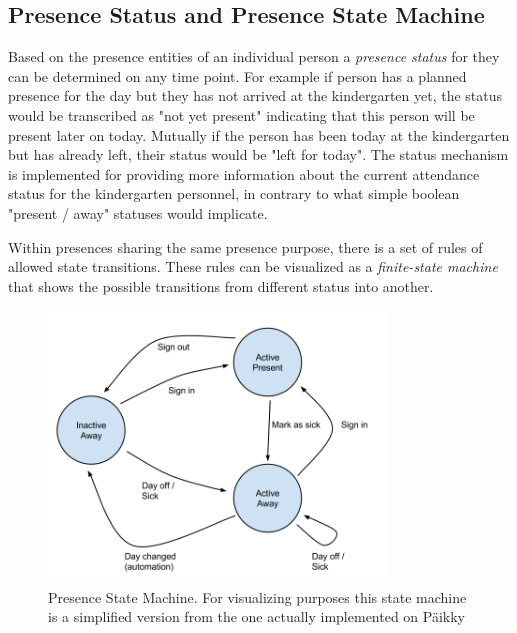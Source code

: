 \subsection{Presence Status and Presence State Machine}

Based on the presence entities of an individual person a \textit{presence status} for they can be determined on any time point. For example if person has a planned presence for the day but they has not arrived at the kindergarten yet, the status would be transcribed as "not yet present" indicating that this person will be present later on today. Mutually if the person has been today at the kindergarten but has already left, their status would be "left for today". The status mechanism is implemented for providing more information about the current attendance status for the kindergarten personnel, in contrary to what simple boolean "present / away" statuses would implicate.

Within presences sharing the same presence purpose, there is a set of rules of allowed state transitions. These rules can be visualized as a \textit{finite-state machine} that shows the possible transitions from different status into another. 

\begin{figure}[t]
\begin{center}
\includegraphics[width=0.8\textwidth]{assets/statemachine.png}
\end{center}
\caption{Presence State Machine. For visualizing purposes this state machine is a simplified version from the one actually implemented on Päikky}
\label{fig:statemachine}
\end{figure}

